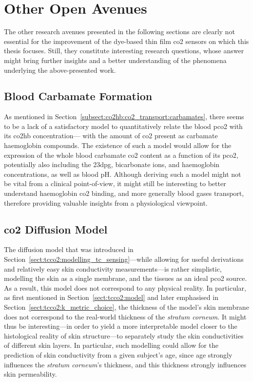 \section{Other Open Avenues}

The other research avenues presented in the following sections are clearly not essential for the improvement of the dye-based thin film \gls{co2} sensors on which this thesis focuses. Still, they constitute interesting research questions, whose answer might bring further insights and a better understanding of the phenomena underlying the above-presented work.

\subsection{Blood Carbamate Formation}

As mentioned in Section~\ref{subsect:co2hb:co2_transport:carbamates}, there seems to be a lack of a satisfactory model to quantitatively relate the blood \gls{pco2} with its \gls{co2hb} concentration---\ie{} with the amount of \gls{co2} present as carbamate haemoglobin compounds. The existence of such a model would allow for the expression of the whole blood carbamate \gls{co2} content as a function of its \gls{pco2}, potentially also including the \gls{23dpg}, bicarbonate ions, and haemoglobin concentrations, as well as blood pH. Although deriving such a model might not be vital from a clinical point-of-view, it might still be interesting to better understand haemoglobin \gls{co2} binding, and more generally blood gases transport, therefore providing valuable insights from a physiological viewpoint.

\subsection{\texorpdfstring{\gls{co2}}{CO2} Diffusion Model}

The diffusion model that was introduced in Section~\ref{sect:tcco2:modelling_tc_sensing}---while allowing for useful derivations and relatively easy skin conductivity measurements---is rather simplistic, modelling the skin as a single membrane, and the tissues as an ideal \gls{pco2} source. As a result, this model does not correspond to any physical reality. In particular, as first mentioned in Section~\ref{sect:tcco2:model} and later emphasised in Section~\ref{sect:tcco2:k_metric_choice}, the thickness of the model's skin membrane does not correspond to the real-world thickness of the \textit{stratum corneum}. It might thus be interesting---in order to yield a more interpretable model closer to the histological reality of skin structure---to separately study the skin conductivities of different skin layers. In particular, such modelling could allow for the prediction of skin conductivity from a given subject's age, since age strongly influences the \textit{stratum corneum}'s thickness\cite{branchet1990}, and this thickness strongly influences skin permeability\cite{scheuplein1976}.


